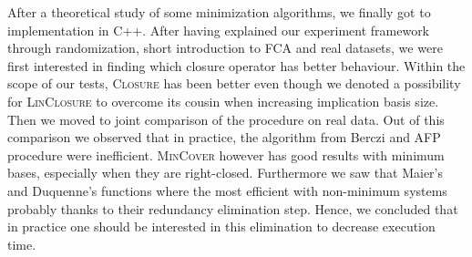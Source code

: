 After a theoretical study of some minimization algorithms, we finally got to implementation in C++. After having explained our experiment framework through
randomization, short introduction to FCA and real datasets, we were first interested in finding which closure operator has better behaviour. Within the scope of our tests, \textsc{Closure} has been better even though we denoted a possibility for \textsc{LinClosure} to overcome its cousin when increasing 
implication basis size. Then we moved to joint comparison of the procedure on
real data. Out of this comparison we observed that in practice, the algorithm
from Berczi and AFP procedure were inefficient. \textsc{MinCover} however has good results with minimum bases, especially when they are right-closed. Furthermore we saw that Maier's and Duquenne's functions where the most efficient with non-minimum systems probably thanks to their redundancy elimination step. Hence, we concluded that in practice one should
be interested in this elimination to decrease execution time.
